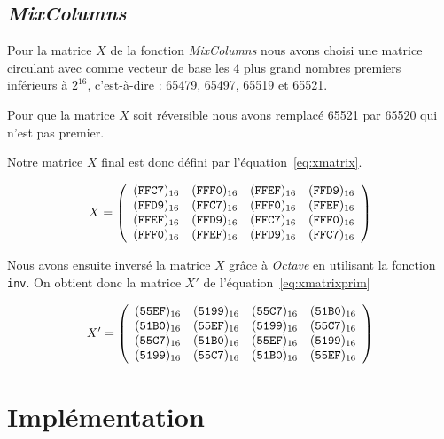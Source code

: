 \documentclass[12pt,a4paper]{report}
\begin{document}
\section{\emph{MixColumns}}

Pour la matrice $X$ de la fonction \emph{MixColumns} nous avons choisi une
matrice circulant avec comme vecteur de base les 4 plus grand nombres premiers
inférieurs à $2^{16}$, c'est-à-dire : 65479, 65497, 65519 et 65521.

Pour que la matrice $X$ soit réversible nous avons remplacé 65521 par 65520 qui
n'est pas premier.

Notre matrice $X$ final est donc défini par l'équation~\ref{eq:xmatrix}.

\begin{equation}
\label{eq:xmatrix}
X = \left(
\begin{array}{cccc}
(\verb|FFC7|)_{16} & (\verb|FFF0|)_{16} & (\verb|FFEF|)_{16} & (\verb|FFD9|)_{16} \\
(\verb|FFD9|)_{16} & (\verb|FFC7|)_{16} & (\verb|FFF0|)_{16} & (\verb|FFEF|)_{16} \\
(\verb|FFEF|)_{16} & (\verb|FFD9|)_{16} & (\verb|FFC7|)_{16} & (\verb|FFF0|)_{16} \\
(\verb|FFF0|)_{16} & (\verb|FFEF|)_{16} & (\verb|FFD9|)_{16} & (\verb|FFC7|)_{16} \\
\end{array}
\right)
\end{equation}

Nous avons ensuite inversé la matrice $X$ grâce à \emph{Octave} en utilisant
la fonction \verb|inv|. On obtient donc la matrice $X'$ de l'équation~\ref{eq:xmatrixprim}

\begin{equation}
\label{eq:xmatrixprim}
X' = \left(
\begin{array}{cccc}
(\verb|55EF|)_{16} & (\verb|5199|)_{16} & (\verb|55C7|)_{16} & (\verb|51B0|)_{16} \\
(\verb|51B0|)_{16} & (\verb|55EF|)_{16} & (\verb|5199|)_{16} & (\verb|55C7|)_{16} \\
(\verb|55C7|)_{16} & (\verb|51B0|)_{16} & (\verb|55EF|)_{16} & (\verb|5199|)_{16} \\
(\verb|5199|)_{16} & (\verb|55C7|)_{16} & (\verb|51B0|)_{16} & (\verb|55EF|)_{16} \\
\end{array}
\right)
\end{equation}


\chapter{Implémentation}
\end{document}
